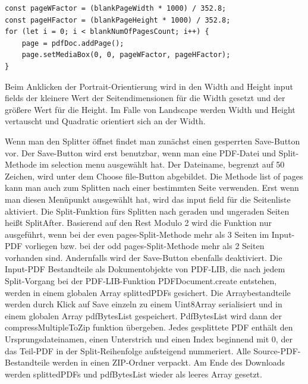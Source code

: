 \begin{lstlisting}[style=ES6, caption={Berechnung der PDF-Seitengröße}, label=code:mediabox, breaklines=true]
const pageWFactor = (blankPageWidth * 1000) / 352.8;
const pageHFactor = (blankPageHeight * 1000) / 352.8;
for (let i = 0; i < blankNumOfPagesCount; i++) {
	page = pdfDoc.addPage();
	page.setMediaBox(0, 0, pageWFactor, pageHFactor);
}
\end{lstlisting} 

Beim Anklicken der Portrait-Orientierung wird in den Width and Height input fields der kleinere Wert der Seitendimensionen für die Width gesetzt und der größere Wert für die Height. Im Falle von Landscape werden Width und Height vertauscht und Quadratic orientiert sich an der Width.
\par
Wenn man den Splitter öffnet findet man zunächst einen gesperrten Save-Button vor. Der Save-Button wird erst benutzbar, wenn man eine PDF-Datei und Split-Methode im selection menu ausgewählt hat. Der Dateiname, begrenzt auf 50 Zeichen, wird unter dem Choose file-Button abgebildet. Die Methode list of pages kann man auch zum Splitten nach einer bestimmten Seite verwenden. Erst wenn man diesen Menüpunkt ausgewählt hat, wird das input field für die Seitenliste aktiviert. Die Split-Funktion fürs Splitten nach geraden und ungeraden Seiten heißt SplitAfter. Basierend auf den Rest Modulo 2 wird die Funktion nur ausgeführt, wenn bei der even pages-Split-Methode mehr als 3 Seiten im Input-PDF vorliegen bzw. bei der odd pages-Split-Methode mehr als 2 Seiten vorhanden sind. Andernfalls wird der Save-Button ebenfalls deaktiviert. Die Input-PDF Bestandteile als Dokumentobjekte von PDF-LIB, die nach jedem Split-Vorgang bei der PDF-LIB-Funktion PDFDocument.create entstehen, werden in einem globalen Array splittedPDFs gesichert. Die Arraybestandteile werden durch Klick auf Save einzeln zu einem Uint8Array serialisiert und in einem globalen Array pdfBytesList gespeichert. PdfBytesList wird dann der compressMultipleToZip funktion übergeben. Jedes gesplittete PDF enthält den Ursprungsdateinamen, einen Unterstrich und einen Index beginnend mit 0, der das Teil-PDF in der Split-Reihenfolge aufsteigend nummeriert. Alle Source-PDF-Bestandteile werden in einen ZIP-Ordner verpackt. Am Ende des Downloads werden splittedPDFs und pdfBytesList wieder als leeres Array gesetzt.
\par
